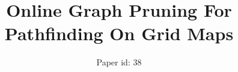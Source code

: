 \documentclass{article}
\begin{document}
\title{Online Graph Pruning For Pathfinding On Grid Maps}
\author{
Paper id: 38
}

\maketitle




%




%



\end{document}
